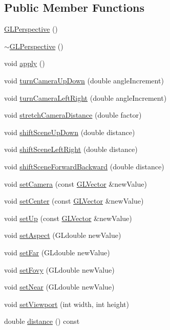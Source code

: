 \subsection*{\-Public \-Member \-Functions}
\begin{DoxyCompactItemize}
\item 
\hyperlink{classGLPerspective_a7776461d3c1f2003fec732fbd57f20be}{\-G\-L\-Perspective} ()
\item 
\hyperlink{classGLPerspective_ad0ca059d1aa3ab81ea0de1286987a7a9}{$\sim$\-G\-L\-Perspective} ()
\item 
void \hyperlink{classGLPerspective_a91531aa2c2fab0c53a49c0fac32aac56}{apply} ()
\item 
void \hyperlink{classGLPerspective_a5a550ad5da6b057ee9dc30f50dde73b8}{turn\-Camera\-Up\-Down} (double angle\-Increment)
\item 
void \hyperlink{classGLPerspective_a7f2fb7087aff9d9b52a8cad0278e84df}{turn\-Camera\-Left\-Right} (double angle\-Increment)
\item 
void \hyperlink{classGLPerspective_a1faea9b30c847b83e52071f24f168a96}{stretch\-Camera\-Distance} (double factor)
\item 
void \hyperlink{classGLPerspective_abc3d6d9327be0c05122cfdfbbb35ae8b}{shift\-Scene\-Up\-Down} (double distance)
\item 
void \hyperlink{classGLPerspective_a15792e2d5f44be8e55bfe4be05220cec}{shift\-Scene\-Left\-Right} (double distance)
\item 
void \hyperlink{classGLPerspective_adac0de0074901f4896f5aaa19373c125}{shift\-Scene\-Forward\-Backward} (double distance)
\item 
void \hyperlink{classGLPerspective_afcdc1500b78321e8f7c172f16b5bb2cd}{set\-Camera} (const \hyperlink{classGLVector}{\-G\-L\-Vector} \&new\-Value)
\item 
void \hyperlink{classGLPerspective_acb39c3e367290da03409361ca42eded9}{set\-Center} (const \hyperlink{classGLVector}{\-G\-L\-Vector} \&new\-Value)
\item 
void \hyperlink{classGLPerspective_a09dd20fedcbc65dc790d1b50c0f94406}{set\-Up} (const \hyperlink{classGLVector}{\-G\-L\-Vector} \&new\-Value)
\item 
void \hyperlink{classGLPerspective_add4215ff5413bd2bf99cd769fc562045}{set\-Aspect} (\-G\-Ldouble new\-Value)
\item 
void \hyperlink{classGLPerspective_a95858a021bcceddd43d1df6822a0ce8d}{set\-Far} (\-G\-Ldouble new\-Value)
\item 
void \hyperlink{classGLPerspective_a585dc3dbb851d1dc2e751879362f8d7d}{set\-Fovy} (\-G\-Ldouble new\-Value)
\item 
void \hyperlink{classGLPerspective_a76c28c1b8d68d0c201c4dfadfd8863be}{set\-Near} (\-G\-Ldouble new\-Value)
\item 
void \hyperlink{classGLPerspective_a2269d593fd75d129c1b695b866afc6d1}{set\-Viewport} (int width, int height)
\item 
double \hyperlink{classGLPerspective_a5052aedb9d61e12e7499040608918a10}{distance} () const 
\end{DoxyCompactItemize}
